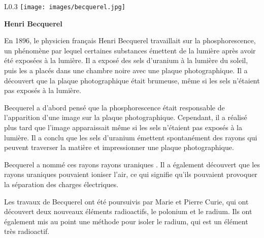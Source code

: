 \begin{wrapfigure}[12]{L}{0.3\textwidth}
    \texttt{[image: images/becquerel.jpg]}
    \begin{center}
        \bfseries Henri Becquerel
    \end{center}
\end{wrapfigure}


En 1896, le physicien français Henri Becquerel travaillait sur la phosphorescence, un phénomène par lequel certaines substances émettent de la lumière après avoir été exposées à la lumière. Il a exposé des sels d'uranium à la lumière du soleil, puis les a placés dans une chambre noire avec une plaque photographique. Il a découvert que la plaque photographique était brumeuse, même si les sels n'étaient pas exposés à la lumière.


\begingroup



Becquerel a d'abord pensé que la phosphorescence était responsable de l'apparition d'une image sur la plaque photographique. Cependant, il a réalisé plus tard que l'image apparaissait même si les sels n'étaient pas exposés à la lumière. Il a conclu que les sels d'uranium émettent spontanément des rayons qui peuvent traverser la matière et impressionner une plaque photographique.


Becquerel a nommé ces rayons \og rayons uraniques \fg. Il a également découvert que les rayons uraniques pouvaient ioniser l'air, ce qui signifie qu'ils pouvaient provoquer la séparation des charges électriques.


Les travaux de Becquerel ont été poursuivis par Marie et Pierre Curie, qui ont découvert deux nouveaux éléments radioactifs, le polonium et le radium. Ils ont également mis au point une méthode pour isoler le radium, qui est un élément très radioactif.

\endgroup

